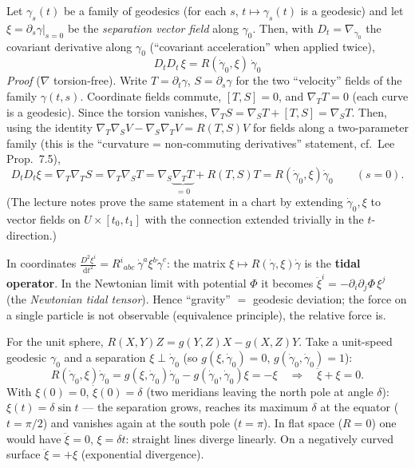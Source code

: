 \documentclass[11pt,a4paper]{article}
\numberwithin{equation}{section}
\theoremstyle{definition}
\theoremstyle{plain}
\newcommand{\dd}{\mathrm{d}}
\begin{document}
\begin{formal}
Let $\gamma_s(t)$ be a family of geodesics (for each $s$, $t\mapsto\gamma_s(t)$ is a geodesic) and let $\xi=\partial_s\gamma|_{s=0}$ be the \emph{separation vector field} along $\gamma_0$. Then, with $D_t=\nabla_{\dot\gamma_0}$ the covariant derivative along $\gamma_0$ (``covariant acceleration'' when applied twice),
\[
\boxed{\ D_tD_t\,\xi=R(\dot\gamma_0,\xi)\,\dot\gamma_0\ }
\]
\emph{Proof} ($\nabla$ torsion-free). Write $T=\partial_t\gamma$, $S=\partial_s\gamma$ for the two ``velocity'' fields of the family $\gamma(t,s)$. Coordinate fields commute, $[T,S]=0$, and $\nabla_TT=0$ (each curve is a geodesic). Since the torsion vanishes, $\nabla_TS=\nabla_ST+[T,S]=\nabla_ST$. Then, using the identity $\nabla_T\nabla_SV-\nabla_S\nabla_TV=R(T,S)V$ for fields along a two-parameter family (this is the ``curvature = non-commuting derivatives'' statement, cf.\ Lee Prop.~7.5),
\[
D_tD_t\xi=\nabla_T\nabla_TS=\nabla_T\nabla_ST=\nabla_S\underbrace{\nabla_TT}_{=0}+R(T,S)T=R(\dot\gamma_0,\xi)\dot\gamma_0\qquad(s=0).
\]
(The lecture notes prove the same statement in a chart by extending $\dot\gamma_0,\xi$ to vector fields on $U\times[t_0,t_1]$ with the connection extended trivially in the $t$-direction.)
\end{formal}
\begin{intuition}[{curvature = tidal tensor}]
In coordinates $\frac{D^2\xi^i}{\dd t^2}=R^i{}_{abc}\ \dot\gamma^a\xi^b\dot\gamma^c$: the matrix $\xi\mapsto R(\dot\gamma,\xi)\dot\gamma$ is the \textbf{tidal operator}. In the Newtonian limit with potential $\Phi$ it becomes $\ddot\xi^i=-\partial_i\partial_j\Phi\,\xi^j$ (the \emph{Newtonian tidal tensor}). Hence ``gravity'' $=$ geodesic deviation; the force on a single particle is not observable (equivalence principle), the relative force is.
\end{intuition}

\begin{example}
For the unit sphere, $R(X,Y)Z=g(Y,Z)X-g(X,Z)Y$. Take a unit-speed geodesic $\gamma_0$ and a separation $\xi\perp\dot\gamma_0$ (so $g(\xi,\dot\gamma_0)=0$, $g(\dot\gamma_0,\dot\gamma_0)=1$):
\[
R(\dot\gamma_0,\xi)\dot\gamma_0=g(\xi,\dot\gamma_0)\dot\gamma_0-g(\dot\gamma_0,\dot\gamma_0)\xi=-\xi\quad\Longrightarrow\quad\ddot\xi+\xi=0 .
\]
With $\xi(0)=0$, $\dot\xi(0)=\delta$ (two meridians leaving the north pole at angle $\delta$): $\xi(t)=\delta\sin t$ --- the separation grows, reaches its maximum $\delta$ at the equator ($t=\pi/2$) and vanishes again at the south pole ($t=\pi$). In flat space ($R=0$) one would have $\ddot\xi=0$, $\xi=\delta t$: straight lines diverge linearly. On a negatively curved surface $\ddot\xi=+\xi$ (exponential divergence).
\end{example}
\end{document}
